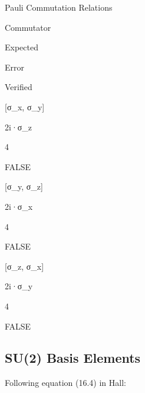 \documentclass[
]{book}
\theoremstyle{definition}
\theoremstyle{definition}
\theoremstyle{definition}
\theoremstyle{definition}
\theoremstyle{remark}
\begin{document}
\label{tab:pauli-commutators}Pauli Commutation Relations

Commutator

Expected

Error

Verified

{[}σ\_x, σ\_y{]}

2i·σ\_z

4

FALSE

{[}σ\_y, σ\_z{]}

2i·σ\_x

4

FALSE

{[}σ\_z, σ\_x{]}

2i·σ\_y

4

FALSE

\subsection{SU(2) Basis Elements}\label{su2-basis-elements}

Following equation (16.4) in Hall:
\end{document}
